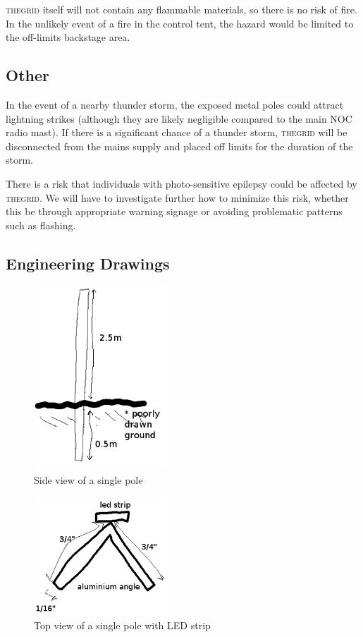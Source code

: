 \documentclass[12pt]{article} %
\newcommand{\thegrid}{\textsc{the\textperiodcentered grid}\xspace}
\begin{document}
\thegrid itself will not contain any flammable materials, so there is no risk of fire.  In the unlikely event of a fire in the control tent, the hazard would be limited to the off-limits backstage area.

\subsection{Other}
In the event of a nearby thunder storm, the exposed metal poles could attract lightning strikes (although they are likely negligible compared to the main NOC radio mast).  If there is a significant chance of a thunder storm, \thegrid will be disconnected from the mains supply and placed off limits for the duration of the storm.

There is a risk that individuals with photo-sensitive epilepsy could be affected by \thegrid.  We will have to investigate further how to minimize this risk, whether this be through appropriate warning signage or avoiding problematic patterns such as flashing.

\clearpage
\begin{appendices}
\section{Engineering Drawings}
\label{app:engdrawings}

\begin{figure}[h]
    \centering
    \includegraphics[width=5cm]{diags/sidepole.png}
    \caption{Side view of a single pole}
\end{figure}

\begin{figure}[h]
    \centering
    \includegraphics[width=5cm]{diags/toppole.png}
    \caption{Top view of a single pole with LED strip}
\end{figure}

\end{appendices}
\end{document}
